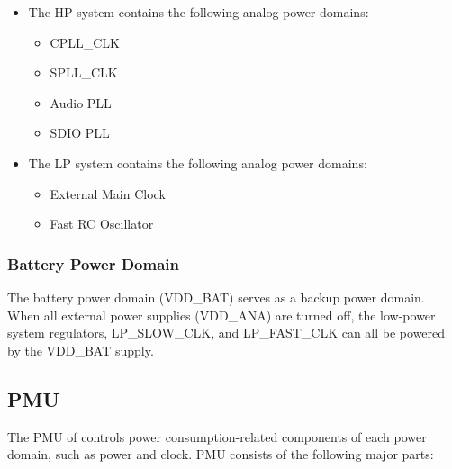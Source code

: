 \documentclass[main\_\_EN.tex]{subfiles}
\begin{document}
\begin{itemize}
    \item The HP system contains the following analog power domains:
    \begin{itemize}
    \item CPLL\_CLK
    \item SPLL\_CLK
    \item Audio PLL
    \item SDIO PLL
    \end{itemize}

    \item The LP system contains the following analog power domains:
    \begin{itemize}
    \item External Main Clock
    \item Fast RC Oscillator
    \end{itemize}
\end{itemize}

\subsubsection{Battery Power Domain}

The battery power domain (VDD\_BAT) serves as a backup power domain. When all external power supplies (VDD\_ANA) are turned off, the low-power system regulators, LP\_SLOW\_CLK, and LP\_FAST\_CLK can all be powered by the VDD\_BAT supply.

\subsection{PMU}

The PMU of \chipname{} controls power consumption-related components of each power domain, such as power and clock. PMU consists of the following major parts:
\end{document}
